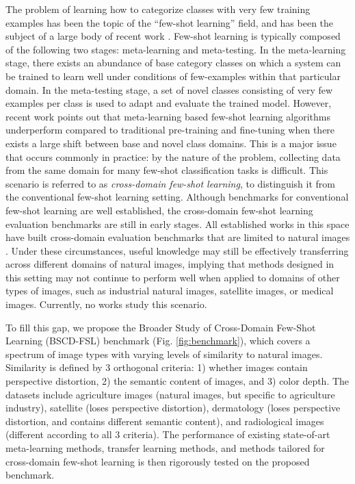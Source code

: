 \documentclass[runningheads]{llncs}
\begin{document}
The problem of learning how to categorize classes with very few training examples has been the topic of the ``few-shot learning'' field, and has been the subject of a large body of recent work \cite{li2006one,ravi2016optimization,vinyals2016matching,finn2017model,snell2017prototypical,chen2018a,sung2018learning}. Few-shot learning is typically composed of the following two stages: meta-learning and meta-testing. In the meta-learning stage, there exists an abundance of base category classes on which a system can be trained to learn well under conditions of few-examples within that particular domain. In the meta-testing stage, a set of novel classes consisting of very few examples per class is used to adapt and evaluate the trained model. However, recent work \cite{chen2018a} points out that meta-learning based few-shot learning algorithms underperform compared to traditional pre-training and fine-tuning when there exists a large shift between base and novel class domains. This is a major issue that occurs commonly in practice: by the nature of the problem, collecting data from the same domain for many few-shot classification tasks is difficult. This scenario is referred to as \textit{cross-domain few-shot learning}, to distinguish it from the conventional few-shot learning setting. Although benchmarks for conventional few-shot learning are well established, the cross-domain few-shot learning evaluation benchmarks are still in early stages. All established works in this space have built cross-domain evaluation benchmarks that are limited to natural images \cite{tsengcrossdomain,chen2018a,triantafillou2019meta}. Under these circumstances, useful knowledge may still be effectively transferring across different domains of natural images, implying that methods designed in this setting may not continue to perform well when applied to domains of other types of images, such as industrial natural images, satellite images, or medical images. Currently, no works study this scenario. 

To fill this gap, we propose the Broader Study of Cross-Domain Few-Shot Learning (BSCD-FSL) benchmark (Fig. \ref{fig:benchmark}), which covers a spectrum of image types with varying levels of similarity to natural images. Similarity is defined by 3 orthogonal criteria: 1) whether images contain perspective distortion, 2) the semantic content of images, and 3) color depth. The datasets include agriculture images (natural images, but specific to agriculture industry), satellite (loses perspective distortion), dermatology (loses perspective distortion, and contains different semantic content), and radiological images (different according to all 3 criteria). The performance of existing state-of-art meta-learning methods, transfer learning methods, and methods tailored for cross-domain few-shot learning is then rigorously tested on the proposed benchmark.
\end{document}
